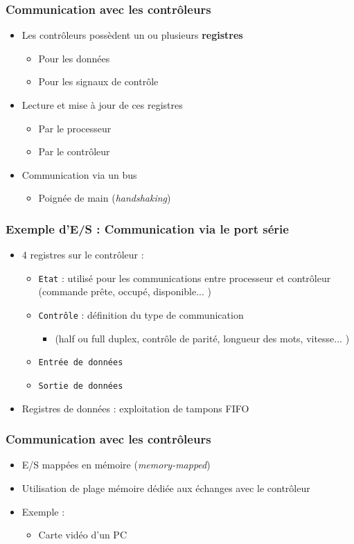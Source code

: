 \begin{frame}
\frametitle{Communication avec les contrôleurs}
\begin{itemize}
\item Les contrôleurs possèdent un ou plusieurs \textbf{registres}
\begin{itemize}
\item Pour les données
\item Pour les signaux de contrôle
\end{itemize}
\item Lecture et mise à jour de ces registres
\begin{itemize}
\item Par le processeur
\item Par le contrôleur
\end{itemize}
\item Communication via un bus
\begin{itemize}
\item Poignée de main (\textit{handshaking})
\end{itemize}
\end{itemize}
\end{frame}

\begin{frame}
\frametitle{Exemple d'E/S : Communication via le port série}
\begin{itemize}
\item 4 registres sur le contrôleur :
\begin{itemize}
\item \texttt{Etat} : utilisé pour les communications entre processeur et contrôleur (commande prête, occupé, disponible... )
\item \texttt{Contrôle} : définition du type de communication
\begin{itemize}
\item (half ou full duplex, contrôle de parité, longueur des mots, vitesse... )
\end{itemize}
\item \texttt{Entrée de données}
\item \texttt{Sortie de données}
\end{itemize}
\item Registres de données : exploitation de tampons FIFO
\end{itemize}
\end{frame}

\begin{frame}
\frametitle{Communication avec les contrôleurs}
\begin{itemize}
\item E/S mappées en mémoire (\textit{memory-mapped})
\item Utilisation de plage mémoire dédiée aux échanges avec le contrôleur
\item Exemple :
\begin{itemize}
\item Carte vidéo d'un PC
\end{itemize}
\end{itemize}
\end{frame}

